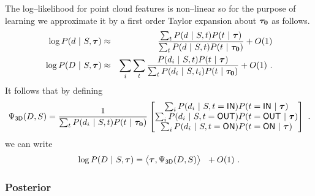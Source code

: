 The log--likelihood for point cloud features  is
non--linear so for the purpose of learning we approximate it by a
first order Taylor expansion about $\IndModelo$ as follows.
\begin{eqnarray}
  \log P(\Depth~|~\Seam,\IndModel)
  &\approx&
  \frac
      {\sum_{\Ind} P(\Depth~|~\Seam,\Ind) P(\Ind~|~\IndModel)}
      {\sum_{\Ind} P(\Depth~|~\Seam,\Ind) P(\Ind~|~\IndModelo)} + O(1)\\
  \log P(\Depths~|~\Seam,\IndModel)
  &\approx&
  \sum_i \sum_{\Ind} \frac
      {P(\Depth_i~|~\Seam,\Ind) P(\Ind~|~\IndModel)}
      {\sum_{\Ind} P(\Depth_i~|~\Seam,\Ind_i) P(\Ind~|~\IndModelo)} + O(1) ~.
\end{eqnarray}
It follows that by defining
\begin{equation}
  \JointFtr_{\textsf{3D}}(\Depths,\Seam) =
  \frac{1}{\sum_{\Ind} P(\Depth_i~|~\Seam,\Ind) P(\Ind~|~\IndModelo)}
  \begin{bmatrix}
    \sum_i P(\Depth_i~|~\Seam,\Ind=\IN) P(\Ind=\IN~|~\IndModel) \\
    \sum_i P(\Depth_i~|~\Seam,\Ind=\OUT) P(\Ind=\OUT~|~\IndModel) \\
    \sum_i P(\Depth_i~|~\Seam,\Ind=\ON) P(\Ind=\ON~|~\IndModel)
  \end{bmatrix}~.
\end{equation}
we can write
\begin{equation}
  \label{eq:linear-pt-model}
  \log P(\Depths~|~\Seam,\IndModel)
  =
  \bigl\langle
    \IndModel, \JointFtr_{\textsf{3D}}(\Depths,\Seam)
  \bigr\rangle ~~ + O(1) ~.
\end{equation}

\subsubsection{Posterior}

